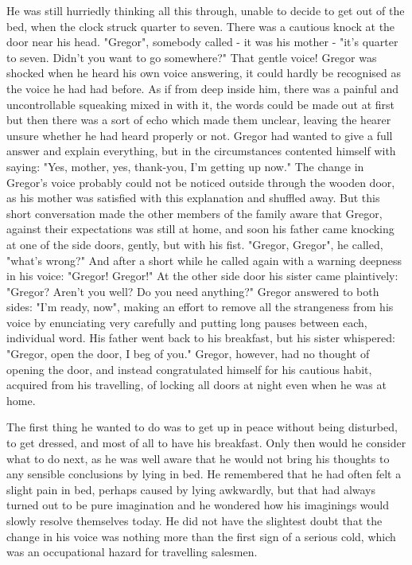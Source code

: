 He was still hurriedly thinking all this through, unable to decide to get out of the bed, when the clock struck quarter to seven. There was a cautious knock at the door near his head. "Gregor", somebody called - it was his mother - "it's quarter to seven. Didn't you want to go somewhere?" That gentle voice! Gregor was shocked when he heard his own voice answering, it could hardly be recognised as the voice he had had before. As if from deep inside him, there was a painful and uncontrollable squeaking mixed in with it, the words could be made out at first but then there was a sort of echo which made them unclear, leaving the hearer unsure whether he had heard properly or not. Gregor had wanted to give a full answer and explain everything, but in the circumstances contented himself with saying: "Yes, mother, yes, thank-you, I'm getting up now." The change in Gregor's voice probably could not be noticed outside through the wooden door, as his mother was satisfied with this explanation and shuffled away. But this short conversation made the other members of the family aware that Gregor, against their expectations was still at home, and soon his father came knocking at one of the side doors, gently, but with his fist. "Gregor, Gregor", he called, "what's wrong?" And after a short while he called again with a warning deepness in his voice: "Gregor! Gregor!" At the other side door his sister came plaintively: "Gregor? Aren't you well? Do you need anything?" Gregor answered to both sides: "I'm ready, now", making an effort to remove all the strangeness from his voice by enunciating very carefully and putting long pauses between each, individual word. His father went back to his breakfast, but his sister whispered: "Gregor, open the door, I beg of you." Gregor, however, had no thought of opening the door, and instead congratulated himself for his cautious habit, acquired from his travelling, of locking all doors at night even when he was at home.

The first thing he wanted to do was to get up in peace without being disturbed, to get dressed, and most of all to have his breakfast. Only then would he consider what to do next, as he was well aware that he would not bring his thoughts to any sensible conclusions by lying in bed. He remembered that he had often felt a slight pain in bed, perhaps caused by lying awkwardly, but that had always turned out to be pure imagination and he wondered how his imaginings would slowly resolve themselves today. He did not have the slightest doubt that the change in his voice was nothing more than the first sign of a serious cold, which was an occupational hazard for travelling salesmen.


